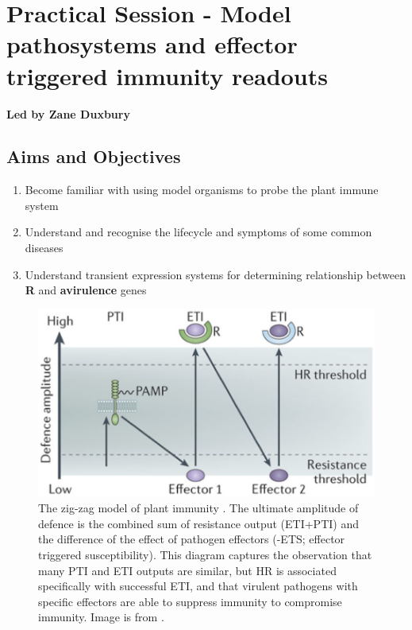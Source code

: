 \documentclass[12pt,]{book}
\providecommand{\tightlist}{%
  \setlength{\itemsep}{0pt}\setlength{\parskip}{0pt}}
\begin{document}
\section*{Practical Session - Model pathosystems and effector triggered
immunity
readouts}\label{practical-session---model-pathosystems-and-effector-triggered-immunity-readouts}

\textbf{Led by Zane Duxbury}

\subsection*{Aims and Objectives}\label{aims-and-objectives}

\begin{enumerate}
\def\labelenumi{\arabic{enumi}.}
\tightlist
\item
  Become familiar with using model organisms to probe the plant immune
  system
\item
  Understand and recognise the lifecycle and symptoms of some common
  diseases
\item
  Understand transient expression systems for determining relationship
  between \textbf{R} and \textbf{avirulence} genes
\end{enumerate}










\begin{figure}
\includegraphics[width=9.78in]{assets/jones_fig1_prac} \caption{The zig-zag model of plant immunity \citep{Jones:2006ih}.
The ultimate amplitude of defence is the combined sum of resistance
output (ETI+PTI) and the difference of the effect of pathogen effectors
(-ETS; effector triggered susceptibility). This diagram captures the
observation that many PTI and ETI outputs are similar, but HR is
associated specifically with successful ETI, and that virulent pathogens
with specific effectors are able to suppress immunity to compromise
immunity. Image is from \citet{Pumplin:2013ix}.}\label{fig:zigzag}
\end{figure}
\end{document}
